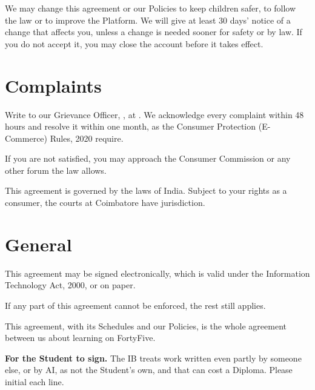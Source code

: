 \documentclass[11pt]{article}
\begin{document}
\begin{clauses}
  \item We may change this agreement or our Policies to keep children safer, to follow the law or to improve the Platform. We will give at least 30 days' notice of a change that affects you, unless a change is needed sooner for safety or by law. If you do not accept it, you may close the account before it takes effect.
\end{clauses}

\section{Complaints}

\begin{clauses}
  \item Write to our Grievance Officer, , at . We acknowledge every complaint within 48 hours and resolve it within one month, as the Consumer Protection (E-Commerce) Rules, 2020 require.
  \item If you are not satisfied, you may approach the Consumer Commission or any other forum the law allows.
  \item This agreement is governed by the laws of India. Subject to your rights as a consumer, the courts at Coimbatore have jurisdiction.
\end{clauses}

\section{General}

\begin{clauses}
  \item This agreement may be signed electronically, which is valid under the Information Technology Act, 2000, or on paper.
  \item If any part of this agreement cannot be enforced, the rest still applies.
  \item This agreement, with its Schedules and our Policies, is the whole agreement between us about learning on FortyFive.
\end{clauses}


\textbf{For the Student to sign.} The IB treats work written even partly by someone else, or by AI, as not the Student's own, and that can cost a Diploma. Please initial each line.
\end{document}
